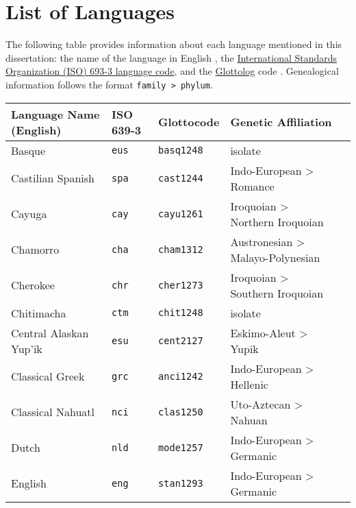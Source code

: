 \chapter*{List of Languages}
\label{ch:languages}

The following table provides information about each language mentioned in this dissertation: the name of the language in English , the \href{https://iso639-3.sil.org/}{International Standards Organization (ISO) 693-3 language code}, and the \href{https://glottolog.org/}{Glottolog} code \parencite{HammarstromForkelHaspelmath2019}. Genealogical information follows the format \texttt{family > phylum}.

\renewcommand{\arraystretch}{1}

\begin{longtable}[c]{ l l l l l }
  \onehalfspacing
  \textbf{Language Name (English)} & \textbf{ISO 639-3} & \textbf{Glottocode} & \textbf{Genetic Affiliation}\\
  \midrule
  Basque                           & \texttt{eus}       & \texttt{basq1248}   & isolate\\
  Castilian Spanish                & \texttt{spa}       & \texttt{cast1244}   & Indo-European > Romance\\
  Cayuga                           & \texttt{cay}       & \texttt{cayu1261}   & Iroquoian > Northern Iroquoian\\
  Chamorro                         & \texttt{cha}       & \texttt{cham1312}   & Austronesian > Malayo-Polynesian\\
  Cherokee                         & \texttt{chr}       & \texttt{cher1273}   & Iroquoian > Southern Iroquoian\\
  Chitimacha                       & \texttt{ctm}       & \texttt{chit1248}   & isolate\\
  Central Alaskan Yup'ik           & \texttt{esu}       & \texttt{cent2127}   & Eskimo-Aleut > Yupik\\
  Classical Greek                  & \texttt{grc}       & \texttt{anci1242}   & Indo-European > Hellenic\\
  Classical Nahuatl                & \texttt{nci}       & \texttt{clas1250}   & Uto-Aztecan > Nahuan\\
  Dutch                            & \texttt{nld}       & \texttt{mode1257}   & Indo-European > Germanic\\
  English                          & \texttt{eng}       & \texttt{stan1293}   & Indo-European > Germanic\\

\end{longtable}
